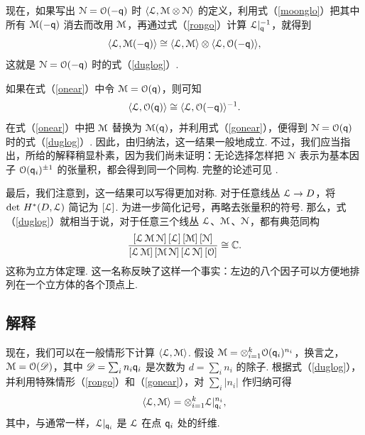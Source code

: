 现在，如果写出 ${\cal N}={\cal O}(-\qq)$ 时 $\langle {\cal L},{\cal M}\otimes {\cal N}\rangle$ 的定义，利用式（\ref{moonglo}）把其中所有 ${\cal M}(-\qq)$ 消去而改用 ${\cal M}$，再通过式（\ref{rongo}）计算 ${\cal L}|_\qq^{-1}$，就得到
\begin{equation}\label{onear}\langle{\cal L},{\cal M}(-\qq)\rangle\cong\langle{\cal L},
{\cal M}\rangle\otimes \langle {\cal L},{\cal O}(-\qq)\rangle,\end{equation}
这就是 ${\cal N}={\cal O}(-\qq)$ 时的式（\ref{duglog}）.

如果在式（\ref{onear}）中令 ${\cal M}={\cal O}(\qq)$，则可知
\begin{equation}\label{gonear}\langle{\cal L},{\cal O}(\qq)\rangle\cong \langle{\cal L},
{\cal O}(-\qq)\rangle^{-1}.
\end{equation}
在式（\ref{onear}）中把 ${\cal M}$ 替换为 ${\cal M}(\qq)$，并利用式（\ref{gonear}），便得到 ${\cal N}={\cal O}(\qq)$ 时的式（\ref{duglog}）. 因此，由归纳法，这一结果一般地成立. 不过，我们应当指出，所给的解释稍显朴素，因为我们尚未证明：无论选择怎样把 $\N$ 表示为基本因子 $\O(\qq_i)^{\pm 1}$ 的张量积，都会得到同一个同构. 完整的论述可见 \cite{deligne}.

最后，我们注意到，这一结果可以写得更加对称. 对于任意线丛 ${\cal L}\to D$，将 $\det\,H^*(D,{\cal L})$ 简记为 $[{\cal L}]$. 为进一步简化记号，再略去张量积的符号. 那么，式（\ref{duglog}）就相当于说，对于任意三个线丛 ${\cal L}$、${\cal M}$、${\cal N}$，都有典范同构
\begin{equation}\label{hurglo} {[{\cal L}\,{\cal M}\,{\cal N}]\,[{\cal L}]\,[{\cal M}]\,
[{\cal N}]
\over [{\cal L}\,{\cal M}]\,[{\cal M}\,{\cal N}]\,[{\cal L}\,{\cal N}]\,[{\cal O}]}
\cong\Bbb{C}.
\end{equation}
这称为立方体定理. 这一名称反映了这样一个事实：左边的八个因子可以方便地排列在一个立方体的各个顶点上.

\subsection{解释}\label{interpretation}

现在，我们可以在一般情形下计算 $\langle{\cal L},{\cal M}\rangle$. 假设 ${\cal M}=\otimes_{i=1}^k{\cal O}(\qq_i)^{n_i}$，换言之，${\cal M} ={\cal O}({\DD})$，其中 ${\DD}=\sum_in_i\qq_i$ 是次数为 $d=\sum_in_i$ 的除子. 根据式（\ref{duglog}），并利用特殊情形（\ref{rongo}）和（\ref{gonear}），对 $\sum_i|n_i|$ 作归纳可得
\begin{equation}\label{trifong}
\langle{\cal L},{\cal M}\rangle=\otimes_{i=1}^k {\cal L}|_{\qq_i}^{n_i},\end{equation}
其中，与通常一样，${\cal L}|_{\qq_i}$ 是 ${\cal L}$ 在点 $\qq_i$ 处的纤维.

